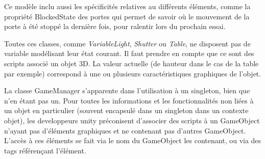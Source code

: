 Ce modèle inclu aussi les spécificités relatives au différents éléments, comme la propriété BlockedState des portes qui permet de savoir où le mouvement de la porte à été stoppé la dernière fois, pour ralentir lors du prochain essai.

Toutes ces classes, comme \textit{VariableLight}, \textit{Shutter} ou \textit{Table},  ne disposent pas de variable modélisant leur état courant. 
Il faut prendre en compte que ce sont des scripts associé un objet 3D. 
La valeur actuelle (de hauteur dans le cas de la table par exemple) correspond à une ou plusieurs caractéristiques graphiques de l'objet.

La classe GameManager s'apparente dans l'utilisation à un singleton, bien que n'en étant pas un. 
Pour toutes les informations et les fonctionnalités non liées à un objet en particulier (souvent encapsulé dans un singleton dans un contexte objet), les developpeurs unity préconisent d'associer des scripts à un GameObject n'ayant pas d'éléments graphiques et ne contenant pas d'autres GameObject.
L'accès à ces éléments se fait via le nom du GameObject les contenant, ou via des tags référençant l'élément.
